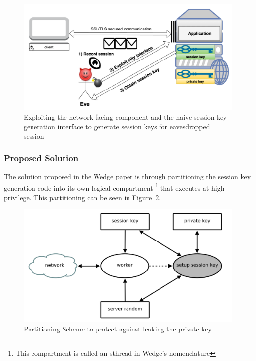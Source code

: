 \documentclass[../main.tex]{subfiles}
\begin{document}
\begin{enumerate}
	\begin{figure}[H]
		\centering
		\includegraphics[scale=0.15]{images/attack2.png}
		\caption{Exploiting the network facing component and the naive 
		session key generation interface to generate session keys for
		eavesdropped session}
		\label{fig:attack2}
	\end{figure}
\end{enumerate}

\subsubsection*{Proposed Solution} 
The solution proposed in the Wedge paper is through partitioning the session key
generation code into its own logical compartment \footnote{This compartment is
called an sthread in Wedge's nomenclature} that executes at high privilege.
This partitioning can be seen in Figure~\ref{fig:wedge-partition}. 

\begin{figure}[H]
	\centering
	\includegraphics[scale=0.25]{images/compartment_01.png}
	\caption{Partitioning Scheme to protect against leaking the private 
	key~\cite{Bittau08}}
	\label{fig:wedge-partition}
\end{figure}
\end{document}
